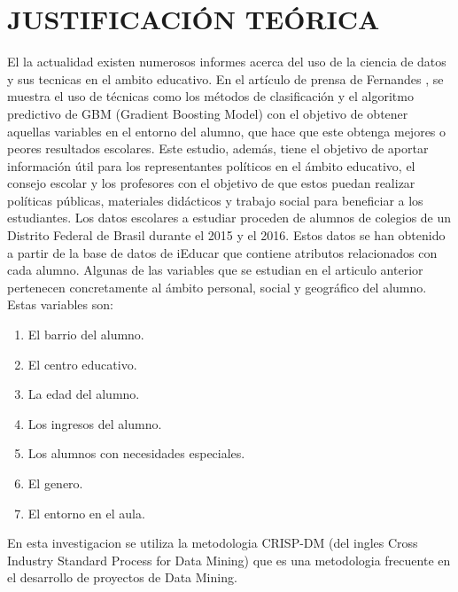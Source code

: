\documentclass[spanish,12pt, a4paper,twoside]{paper}
\let\oldsection\section
\def\section{\cleardoublepage\oldsection}
\begin{document}
\section{JUSTIFICACIÓN TEÓRICA}
\justify
El la actualidad existen numerosos informes acerca del uso de la ciencia de datos y sus tecnicas en el ambito educativo. 
\justify
En el artículo de prensa de Fernandes \cite{Fernandes2018}, se muestra el uso de técnicas como los métodos de clasificación y el algoritmo predictivo de GBM (Gradient Boosting Model) con el objetivo de obtener aquellas variables en el entorno del alumno, que hace que este obtenga mejores o peores resultados escolares. Este estudio, además, tiene el objetivo de aportar información útil para los representantes políticos en el ámbito educativo, el consejo escolar y los profesores con el objetivo de que estos puedan realizar políticas públicas, materiales didácticos y trabajo social para beneficiar a los estudiantes.
\justify
Los datos escolares a estudiar proceden de alumnos de colegios de un Distrito Federal de Brasil durante el 2015 y el 2016. Estos datos se han obtenido a partir de la base de datos de iEducar que contiene atributos relacionados con cada alumno. 
\justify
Algunas de las variables que se estudian en el articulo anterior pertenecen concretamente al ámbito personal, social y geográfico del alumno. Estas variables son:
\begin{enumerate}[itemsep=0mm]
\item El barrio del alumno.
\item El centro educativo.
\item La edad del alumno.
\item Los ingresos del alumno.
\item Los alumnos con necesidades especiales.
\item El genero. 
\item El entorno en el aula.
\end{enumerate}
\justify
En esta investigacion se utiliza la metodologia CRISP-DM (del ingles Cross Industry Standard Process for Data Mining) que es una metodologia frecuente en el desarrollo de proyectos de Data Mining.
\justify
\end{document}
